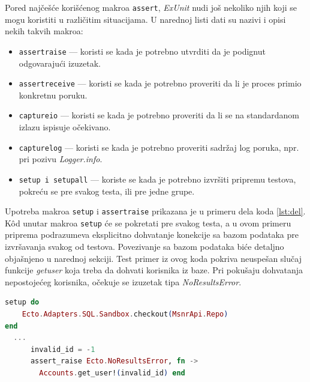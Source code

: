 \documentclass[12pt,oneside]{memoir}
\begin{document}
\par Pored najčešće korišćenog makroa \texttt{assert}, \emph{ExUnit} nudi još nekoliko njih koji se mogu koristiti u različitim situacijama. U narednoj listi dati su nazivi i opisi nekih takvih makroa:
 \begin{itemize}
 \item \texttt{assert{\textunderscore}raise} --- koristi se kada je potrebno utvrditi da je podignut odgovarajući izuzetak. 
 \item \texttt{assert{\textunderscore}receive} --- koristi se kada je potrebno proveriti da li je proces primio konkretnu poruku.
 \item \texttt{capture{\textunderscore}io} --- koristi se kada je potrebno proveriti da li se na standardanom izlazu ispisuje očekivano.
 \item \texttt{capture{\textunderscore}log} --- koristi se kada je potrebno proveriti sadržaj log poruka, npr. pri pozivu \emph{Logger.info}.
 \item \texttt{setup i setup{\textunderscore}all} --- koriste se kada je potrebno izvršiti pripremu testova, pokreću se pre svakog testa, ili pre jedne grupe.
 \end{itemize}
 
\par Upotreba makroa \texttt{setup} i \texttt{assert{\textunderscore}raise} prikazana je u primeru dela koda \ref{lst:del}. K\^{o}d  unutar makroa \texttt{setup} će se pokretati pre svakog testa, a u ovom primeru priprema podrazumeva eksplicitno dohvatanje konekcije sa bazom podataka pre izvršavanja svakog od testova. Povezivanje sa bazom podataka biće detaljno objašnjeno u narednoj sekciji. Test primer iz ovog koda pokriva neuspešan slučaj funkcije \emph{get{\textunderscore}user} koja treba da dohvati korisnika iz baze. Pri pokušaju dohvatanja nepostojećeg korisnika, očekuje se izuzetak tipa \emph{NoResultsError}. \\
 
 \begin{minipage}{\linewidth}
\begin{lstlisting}[language=elixir, basicstyle=\small, caption={Upotreba makroa \texttt{setup} i \texttt{assert{\textunderscore}raise} na primeru funkcije \emph{get{\textunderscore}user}},captionpos=b, label={lst:del}]
setup do
    Ecto.Adapters.SQL.Sandbox.checkout(MsnrApi.Repo)
end
  ...
      invalid_id = -1
      assert_raise Ecto.NoResultsError, fn ->
        Accounts.get_user!(invalid_id) end
  
\end{lstlisting}
\end{minipage}
\end{document}
